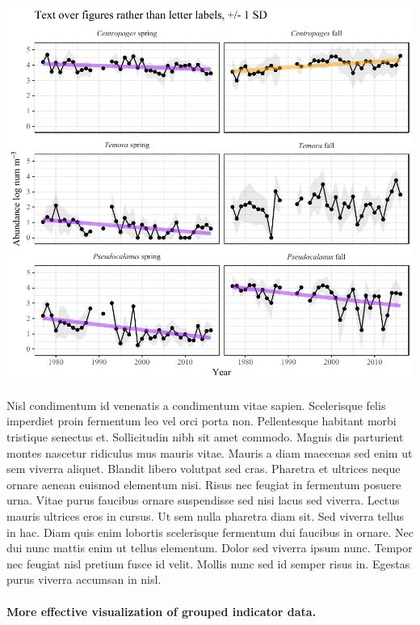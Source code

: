 \documentclass[11pt,]{article}
\let\oldparagraph\paragraph
\renewcommand{\paragraph}[1]{\oldparagraph{#1}\mbox{}}
\begin{document}
\begin{flushleft}\includegraphics{font_test_files/figure-latex/unnamed-chunk-4-1} \end{flushleft}

Nisl condimentum id venenatis a condimentum vitae sapien. Scelerisque
felis imperdiet proin fermentum leo vel orci porta non. Pellentesque
habitant morbi tristique senectus et. Sollicitudin nibh sit amet
commodo. Magnis dis parturient montes nascetur ridiculus mus mauris
vitae. Mauris a diam maecenas sed enim ut sem viverra aliquet. Blandit
libero volutpat sed cras. Pharetra et ultrices neque ornare aenean
euismod elementum nisi. Risus nec feugiat in fermentum posuere urna.
Vitae purus faucibus ornare suspendisse sed nisi lacus sed viverra.
Lectus mauris ultrices eros in cursus. Ut sem nulla pharetra diam sit.
Sed viverra tellus in hac. Diam quis enim lobortis scelerisque fermentum
dui faucibus in ornare. Nec dui nunc mattis enim ut tellus elementum.
Dolor sed viverra ipsum nunc. Tempor nec feugiat nisl pretium fusce id
velit. Mollis nunc sed id semper risus in. Egestas purus viverra
accumsan in nisl.

\hypertarget{more-effective-visualization-of-grouped-indicator-data.}{%
\paragraph{More effective visualization of grouped indicator
data.}\label{more-effective-visualization-of-grouped-indicator-data.}}
\end{document}
